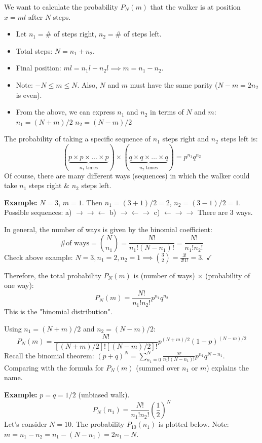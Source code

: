 \documentclass[11pt]{article}
\begin{document}
We want to calculate the probability $P_N(m)$ that the walker is at position $x=ml$ after $N$ steps.
\begin{itemize}
    \item Let $n_1 = \#$ of steps right, $n_2 = \#$ of steps left.
    \item Total steps: $N = n_1 + n_2$.
    \item Final position: $ml = n_1 l - n_2 l \implies m = n_1 - n_2$.
    \item Note: $-N \le m \le N$. Also, $N$ and $m$ must have the same parity ($N-m = 2n_2$ is even).
    \item From the above, we can express $n_1$ and $n_2$ in terms of $N$ and $m$:
      $n_1 = (N+m)/2$
      $n_2 = (N-m)/2$
\end{itemize}

The probability of taking a specific sequence of $n_1$ steps right and $n_2$ steps left is:
\[ (\underbrace{p \times p \times \dots \times p}_{n_1 \text{ times}}) \times (\underbrace{q \times q \times \dots \times q}_{n_2 \text{ times}}) = p^{n_1} q^{n_2} \]
Of course, there are many different ways (sequences) in which the walker could take $n_1$ steps right \& $n_2$ steps left.

\textbf{Example:} $N=3$, $m=1$. Then $n_1=(3+1)/2=2$, $n_2=(3-1)/2=1$.
Possible sequences:
a) $\rightarrow \rightarrow \leftarrow$
b) $\rightarrow \leftarrow \rightarrow$
c) $\leftarrow \rightarrow \rightarrow$
There are 3 ways.

In general, the number of ways is given by the binomial coefficient:
\[ \text{\# of ways} = \binom{N}{n_1} = \frac{N!}{n_1! (N-n_1)!} = \frac{N!}{n_1! n_2!} \]
Check above example: $N=3, n_1=2, n_2=1 \implies \binom{3}{2} = \frac{3!}{2!1!} = 3$. $\checkmark$

Therefore, the total probability $P_N(m)$ is (number of ways) $\times$ (probability of one way):
\[ P_N(m) = \frac{N!}{n_1! n_2!} p^{n_1} q^{n_2} \]
This is the "binomial distribution".

Using $n_1 = (N+m)/2$ and $n_2 = (N-m)/2$:
\[ P_N(m) = \frac{N!}{[(N+m)/2]! [(N-m)/2]!} p^{(N+m)/2} (1-p)^{(N-m)/2} \]
Recall the binomial theorem: $(p+q)^N = \sum_{n_1=0}^{N} \frac{N!}{n_1!(N-n_1)!} p^{n_1} q^{N-n_1}$. Comparing with the formula for $P_N(m)$ (summed over $n_1$ or $m$) explains the name.

\textbf{Example:} $p=q=1/2$ (unbiased walk).
\[ P_N(n_1) = \frac{N!}{n_1! n_2!} \left(\frac{1}{2}\right)^N \]
Let's consider $N=10$. The probability $P_{10}(n_1)$ is plotted below.
Note: $m = n_1 - n_2 = n_1 - (N-n_1) = 2n_1 - N$.
\end{document}
